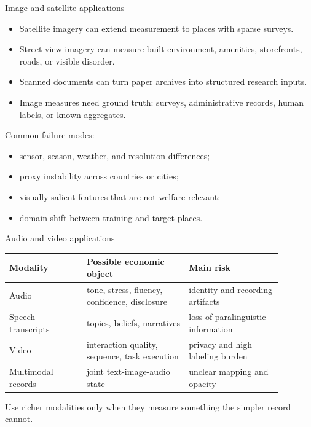 \documentclass[aspectratio=169,11pt]{beamer}
\newcommand{\1}{\mathbf{1}}
\begin{document}
\begin{frame}{Image and satellite applications}
\small
\begin{itemize}
    \item Satellite imagery can extend measurement to places with sparse surveys.
    \item Street-view imagery can measure built environment, amenities, storefronts, roads, or visible disorder.
    \item Scanned documents can turn paper archives into structured research inputs.
    \item Image measures need ground truth: surveys, administrative records, human labels, or known aggregates.
\end{itemize}

\medskip
Common failure modes:
\begin{itemize}
    \item sensor, season, weather, and resolution differences;
    \item proxy instability across countries or cities;
    \item visually salient features that are not welfare-relevant;
    \item domain shift between training and target places.
\end{itemize}
\end{frame}

\begin{frame}{Audio and video applications}
\small
\begin{tabular}{p{0.25\linewidth} p{0.33\linewidth} p{0.30\linewidth}}
\toprule
Modality & Possible economic object & Main risk \\
\midrule
Audio & tone, stress, fluency, confidence, disclosure & identity and recording artifacts \\
Speech transcripts & topics, beliefs, narratives & loss of paralinguistic information \\
Video & interaction quality, sequence, task execution & privacy and high labeling burden \\
Multimodal records & joint text-image-audio state & unclear mapping and opacity \\
\bottomrule
\end{tabular}

\medskip
Use richer modalities only when they measure something the simpler record cannot.
\end{frame}
\end{document}
